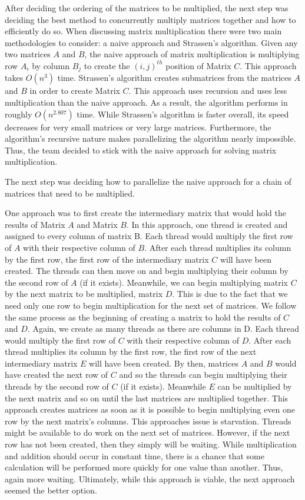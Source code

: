 \documentclass[conference,leqno]{IEEEtran}
\begin{document}
After deciding the ordering of the matrices to be multiplied, the next step was deciding the best method to concurrently multiply matrices together and how to efficiently do so. When discussing matrix multiplication there were two main methodologies to consider: a naive approach and Strassen’s algorithm. Given any two matrices $A$ and $B$, the naive approach of matrix multiplication is multiplying row $A_i$ by column $B_j$ to create the $(i, j)^{th}$ position of Matrix $C$. This approach takes $O(n^3)$ time. Strassen’s algorithm creates submatrices from the matrices $A$ and $B$ in order to create Matrix $C$. This approach uses recursion and uses less multiplication than the naive approach. As a result, the algorithm performs in roughly $O(n^2.807)$ time. While Strassen’s algorithm is faster overall, its speed decreases for very small matrices or very large matrices. Furthermore, the algorithm’s recursive nature makes parallelizing the algorithm nearly impossible. Thus, the team decided to stick with the naive approach for solving matrix multiplication.

The next step was deciding how to parallelize the naive approach for a chain of matrices that need to be multiplied.

One approach was to first create the intermediary matrix that would hold the results of Matrix $A$ and Matrix $B$. In this approach, one thread is created and assigned to every column of matrix B. Each thread would multiply the first row of $A$ with their respective column of $B$. After each thread multiplies its column by the first row, the first row of the intermediary matrix $C$ will have been created. The threads can then move on and begin multiplying their column by the second row of $A$ (if it exists). Meanwhile, we can begin multiplying matrix $C$ by the next matrix to be multiplied, matrix $D$. This is due to the fact that we need only one row to begin multiplication for the next set of matrices. We follow the same process as the beginning of creating a matrix to hold the results of $C$ and $D$. Again, we create as many threads as there are columns in D. Each thread would multiply the first row of $C$ with their respective column of $D$. After each thread multiplies its column by the first row, the first row of the next intermediary matrix $E$ will have been created. By then, matrices $A$ and $B$ would have created the next row of $C$ and so the threads can begin multiplying their threads by the second row of $C$ (if it exists). Meanwhile $E$ can be multiplied by the next matrix and so on until the last matrices are multiplied together. This approach creates matrices as soon as it is possible to begin multiplying even one row by the next matrix’s columns. This approaches issue is starvation. Threads might be available to do work on the next set of matrices. However, if the next row has not been created, then they simply will be waiting. While multiplication and addition should occur in constant time, there is a chance that some calculation will be performed more quickly for one value than another. Thus, again more waiting. Ultimately, while this approach is viable, the next approach seemed the better option.
\end{document}

